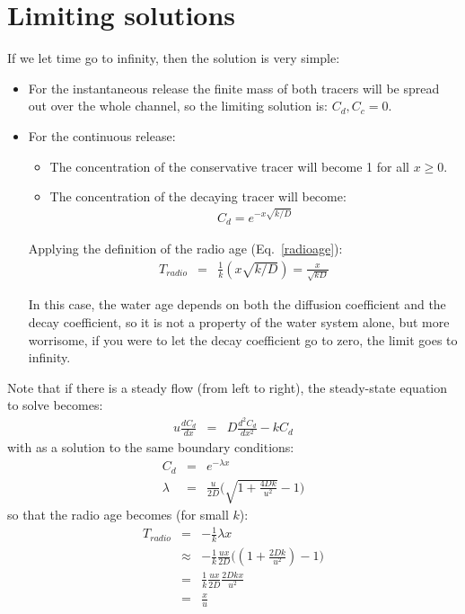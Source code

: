 \documentclass[onecolumn]{article}
\begin{document}
\section*{Limiting solutions}
If we let time go to infinity, then the solution is very simple:
\begin{itemize}
\item
For the instantaneous release the finite mass of both tracers will be spread out over the whole channel, so the
limiting solution is: $C_d, C_c = 0$.
\item
For the continuous release:
\begin{itemize}
\item
The concentration of the conservative tracer will become 1 for all $x \geq 0$.
\item
The concentration of the decaying tracer will become:
\begin{eqnarray}
    C_d = e^{-x \sqrt{k/D}}
\end{eqnarray}
\end{itemize}
Applying the definition of the radio age (Eq.\ \ref{radioage}):
\begin{eqnarray}
    T_{radio} &=& \frac{1}{k} (x \sqrt{k/D}) = \frac{x}{\sqrt{kD}}
\end{eqnarray}

In this case, the water age depends on both the diffusion coefficient and the decay coefficient, so it is not
a property of the water system alone, but more worrisome, if you were to let the decay coefficient go to zero,
the limit goes to infinity.
\end{itemize}

Note that if there is a steady flow (from left to right), the steady-state equation to solve becomes:
\begin{eqnarray}
      u \frac{dC_d}{dx} &=& D \frac{d^2C_d}{dx^2} - k C_d
\end{eqnarray}
\noindent with as a solution to the same boundary conditions:
\begin{eqnarray}
      C_d &=& e^{-\lambda x} \\
      \lambda &=& \frac{u}{2D} \bigl(\sqrt{1 + \frac{4 D k}{u^2}} - 1 \bigr)
\end{eqnarray}
\noindent so that the radio age becomes (for small $k$):
\begin{eqnarray}
\nonumber T_{radio} &=&       -\frac{1}{k} \lambda x \\
\nonumber      &\approx& -\frac{1}{k} \frac{u x}{2D} \bigl((1 + \frac{2 D k}{u^2}) - 1 \bigr) \\
\nonumber      &=&       \frac{1}{k} \frac{u x}{2D} \frac{2 D k x}{u^2} \\
               &=&       \frac{x}{u}
\end{eqnarray}
\end{document}
